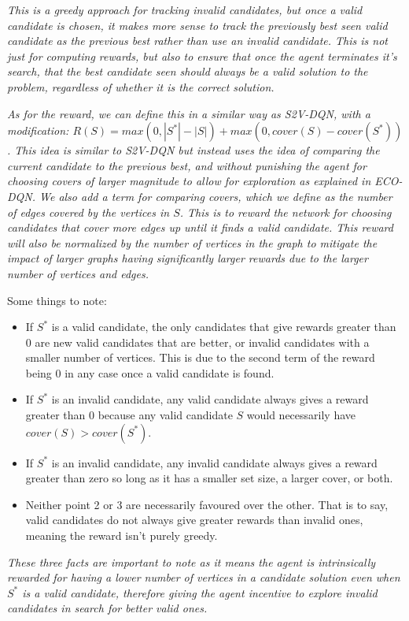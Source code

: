 \documentclass{article}
\begin{document}
\textit{This is a greedy approach for tracking invalid candidates, but once a valid candidate is chosen, it makes more sense to track the previously best seen valid candidate as the previous best rather than use an invalid candidate. This is not just for computing rewards, but also to ensure that once the agent terminates it's search, that the best candidate seen should always be a valid solution to the problem, regardless of whether it is the correct solution.}

\textit{As for the reward, we can define this in a similar way as S2V-DQN, with a modification: $R(S) = max(0, |S^*| - |S|) + max(0, cover(S) - cover(S^*))$. This idea is similar to S2V-DQN but instead uses the idea of comparing the current candidate to the previous best, and without punishing the agent for choosing covers of larger magnitude to allow for exploration as explained in ECO-DQN. We also add a term for comparing covers, which we define as the number of edges covered by the vertices in $S$. This is to reward the network for choosing candidates that cover more edges up until it finds a valid candidate. This reward will also be normalized by the number of vertices in the graph to mitigate the impact of larger graphs having significantly larger rewards due to the larger number of vertices and edges.}

Some things to note:

\begin{itemize}
    \item If $S^*$ is a valid candidate, the only candidates that give rewards greater than 0 are new valid candidates that are better, or invalid candidates with a smaller number of vertices. This is due to the second term of the reward being 0 in any case once a valid candidate is found.
    \item If $S^*$ is an invalid candidate, any valid candidate always gives a reward greater than 0 because any valid candidate $S$ would necessarily have $cover(S) > cover(S^*)$. 
    \item If $S^*$ is an invalid candidate, any invalid candidate always gives a reward greater than zero so long as it has a smaller set size, a larger cover, or both.
    \item Neither point 2 or 3 are necessarily favoured over the other. That is to say, valid candidates do not always give greater rewards than invalid ones, meaning the reward isn't purely greedy.
\end{itemize}

\textit{These three facts are important to note as it means the agent is intrinsically rewarded for having a lower number of vertices in a candidate solution even when $S^*$ is a valid candidate, therefore giving the agent incentive to explore invalid candidates in search for better valid ones.}
\end{document}
